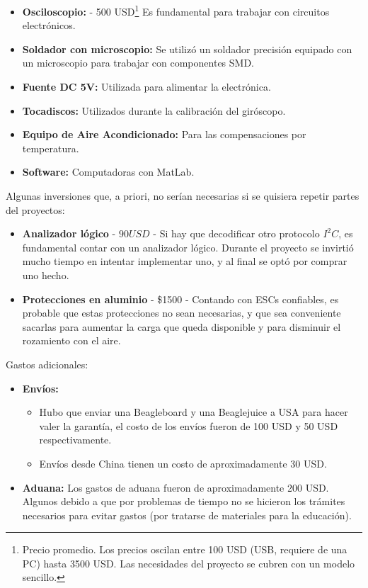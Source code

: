 \documentclass[main]{subfiles}
\begin{document}
\begin{itemize}
\item \textbf{Osciloscopio:} - 500 USD\footnote{Precio promedio. Los precios oscilan entre 100 USD (USB, requiere de una PC) hasta 3500 USD. Las necesidades del proyecto se cubren con un modelo sencillo.} Es fundamental para trabajar con circuitos electrónicos.
\item \textbf{Soldador con microscopio:} Se utilizó un soldador precisión equipado con un microscopio para trabajar con componentes SMD.
\item \textbf{Fuente DC 5V:} Utilizada para alimentar la electrónica.
\item \textbf{Tocadiscos:} Utilizados durante la calibración del giróscopo.
\item \textbf{Equipo de Aire Acondicionado:} Para las compensaciones por temperatura.
\item \textbf{Software:} Computadoras con MatLab.
\end{itemize}

Algunas inversiones que, a priori, no serían necesarias si se quisiera repetir partes del proyectos:

\begin{itemize}
\item \textbf{Analizador lógico} - $90 USD$ - Si hay que decodificar otro protocolo $I^2C$, es fundamental contar con un analizador lógico. Durante el proyecto se invirtió mucho tiempo en intentar implementar uno, y al final se optó por comprar uno hecho.
\item \textbf{Protecciones en aluminio} - \$1500 - Contando con ESCs confiables, es probable que estas protecciones no sean necesarias, y que sea conveniente sacarlas para aumentar la carga que queda disponible y para disminuir el rozamiento con el aire.
\end{itemize}

Gastos adicionales:

\begin{itemize}
\item \textbf{Envíos:}
  \begin{itemize}
  \item Hubo que enviar una Beagleboard y una Beaglejuice a USA para hacer valer la garantía, el costo de los envíos fueron de 100 USD y 50 USD respectivamente.
  \item Envíos desde China tienen un costo de aproximadamente 30 USD.
  \end{itemize}
\item \textbf{Aduana:} Los gastos de aduana fueron de aproximadamente 200 USD. Algunos debido a que por problemas de tiempo no se hicieron los trámites necesarios para evitar gastos (por tratarse de materiales para la educación).
\end{itemize}
\end{document}
